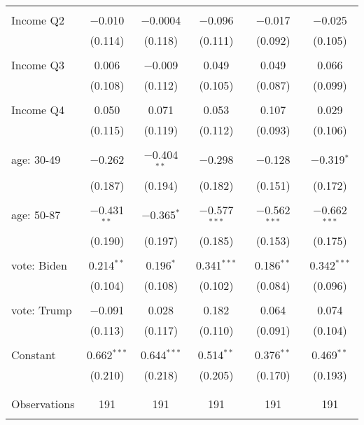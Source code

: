 \begin{tabular}{@{\extracolsep{5pt}}lccccc}
  & & & & & \\ 
 Income Q2 & $-$0.010 & $-$0.0004 & $-$0.096 & $-$0.017 & $-$0.025 \\ 
  & (0.114) & (0.118) & (0.111) & (0.092) & (0.105) \\ 
  & & & & & \\ 
 Income Q3 & 0.006 & $-$0.009 & 0.049 & 0.049 & 0.066 \\ 
  & (0.108) & (0.112) & (0.105) & (0.087) & (0.099) \\ 
  & & & & & \\ 
 Income Q4 & 0.050 & 0.071 & 0.053 & 0.107 & 0.029 \\ 
  & (0.115) & (0.119) & (0.112) & (0.093) & (0.106) \\ 
  & & & & & \\ 
 age: 30-49 & $-$0.262 & $-$0.404$^{**}$ & $-$0.298 & $-$0.128 & $-$0.319$^{*}$ \\ 
  & (0.187) & (0.194) & (0.182) & (0.151) & (0.172) \\ 
  & & & & & \\ 
 age: 50-87 & $-$0.431$^{**}$ & $-$0.365$^{*}$ & $-$0.577$^{***}$ & $-$0.562$^{***}$ & $-$0.662$^{***}$ \\ 
  & (0.190) & (0.197) & (0.185) & (0.153) & (0.175) \\ 
  & & & & & \\ 
 vote: Biden & 0.214$^{**}$ & 0.196$^{*}$ & 0.341$^{***}$ & 0.186$^{**}$ & 0.342$^{***}$ \\ 
  & (0.104) & (0.108) & (0.102) & (0.084) & (0.096) \\ 
  & & & & & \\ 
 vote: Trump & $-$0.091 & 0.028 & 0.182 & 0.064 & 0.074 \\ 
  & (0.113) & (0.117) & (0.110) & (0.091) & (0.104) \\ 
  & & & & & \\ 
 Constant & 0.662$^{***}$ & 0.644$^{***}$ & 0.514$^{**}$ & 0.376$^{**}$ & 0.469$^{**}$ \\ 
  & (0.210) & (0.218) & (0.205) & (0.170) & (0.193) \\ 
  & & & & & \\ 
\hline \\[-1.8ex] 

Observations & 191 & 191 & 191 & 191 & 191 \\ 
\hline 
\hline \\[-1.8ex] 
\end{tabular} 